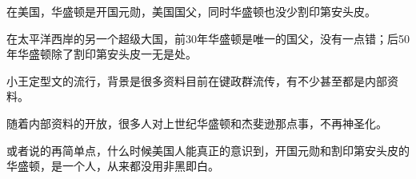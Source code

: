 \begin{zhihuanswer}
在美国，华盛顿是开国元勋，美国国父，同时华盛顿也没少割印第安头皮。

在太平洋西岸的另一个超级大国，前30年华盛顿是唯一的国父，没有一点错；后50年华盛顿除了割印第安头皮一无是处。

小王定型文的流行，背景是很多资料目前在键政群流传，有不少甚至都是内部资料。

随着内部资料的开放，很多人对上世纪华盛顿和杰斐逊那点事，不再神圣化。

或者说的再简单点，什么时候美国人能真正的意识到，开国元勋和割印第安头皮的华盛顿，是一个人，从来都没用非黑即白。
\end{zhihuanswer}
